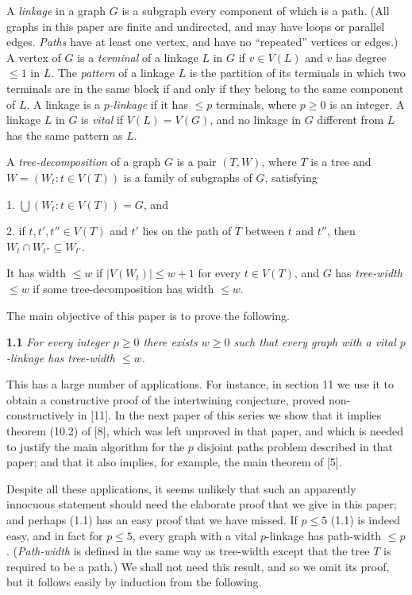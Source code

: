 
A \textit{linkage} in a graph $G$ is a subgraph every component of which is a path. (All graphs in this paper are finite and undirected, and may have loops or parallel edges. \textit{Paths} have at least one vertex, and have no ``repeated'' vertices or edges.) A vertex of $G$ is a \textit{terminal} of a linkage $L$ in $G$ if $v \in V(L)$ and $v$ has degree $\le 1$ in $L$. The \textit{pattern} of a linkage $L$ is the partition of its terminals in which two terminals are in the same block if and only if they belong to the same component of $L$. A linkage is a \textit{$p$-linkage} if it has $\le p$ terminals, where $p \ge 0$ is an integer. A linkage $L$ in $G$ is \textit{vital} if $V(L) = V(G)$, and no linkage in $G$ different from $L$ has the same pattern as $L$.

A \textit{tree-decomposition} of a graph $G$ is a pair $(T, W)$, where $T$ is a tree and $W = (W_t : t \in V(T))$ is a family of subgraphs of $G$, satisfying

\hspace*{12pt}1. $\bigcup(W_t : t \in V(T)) = G$, and

\hspace*{12pt}2. if $t, t', t'' \in V(T)$ and $t'$ lies on the path of $T$ between $t$ and $t''$, then $W_t \cap W_{t''} \subseteq W_{t'}$.

It has width $\le w$ if $|V(W_t)| \le w + 1$ for every $t \in V(T)$, and $G$ has \textit{tree-width} $\le w$ if some tree-decomposition has width $\le w$.

The main objective of this paper is to prove the following.

\textbf{1.1} \textit{For every integer $p \ge 0$ there exists $w \ge 0$ such that every graph with a vital $p$-linkage has tree-width $\le w$.}

This has a large number of applications. For instance, in section 11 we use it to obtain a constructive proof of the intertwining conjecture, proved non-constructively in [11]. In the next paper of this series we show that it implies theorem (10.2) of [8], which was left unproved in that paper, and which is needed to justify the main algorithm for the $p$ disjoint paths problem described in that paper; and that it also implies, for example, the main theorem of [5].

Despite all these applications, it seems unlikely that such an apparently innocuous statement should need the elaborate proof that we give in this paper; and perhaps (1.1) has an easy proof that we have missed. If $p \le 5$ (1.1) is indeed easy, and in fact for $p \le 5$, every graph with a vital $p$-linkage has path-width $\le p$. (\textit{Path-width} is defined in the same way as tree-width except that the tree $T$ is required to be a path.) We shall not need this result, and so we omit its proof, but it follows easily by induction from the following.
